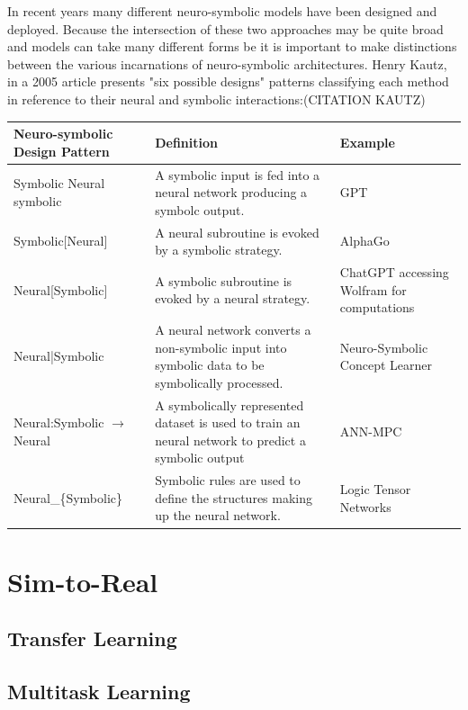 \documentclass[doublespace,draft,nopageskip]{VTthesis} %
\begin{document}
	In recent years many different neuro-symbolic models have been designed and deployed. Because the intersection of these two approaches may be quite broad and models can take many different forms be it is important to make distinctions between the various incarnations of neuro-symbolic architectures. Henry Kautz, in a 2005 article presents "six possible designs" patterns classifying each method in reference to their neural and symbolic interactions:(CITATION KAUTZ)
	\begin{scriptsize}
		\begin{center}
			\begin{tabular}{ | m{5cm} | m{5cm}| m{5cm} | }
				\hline
				\textbf{Neuro-symbolic Design Pattern} & \textbf{Definition} & \textbf{Example}\\
				\hline
				Symbolic Neural symbolic & A symbolic input is fed into a neural network producing a symbolc output. & GPT \\
				\hline
				Symbolic[Neural] & A neural subroutine is evoked by a symbolic strategy. & AlphaGo \\
				\hline
				Neural[Symbolic] & A symbolic subroutine is evoked by a neural strategy. & ChatGPT accessing Wolfram for computations\\
				\hline
				Neural|Symbolic & A neural network converts a non-symbolic input into symbolic data to be symbolically processed. & Neuro-Symbolic Concept Learner \\
				\hline
				Neural:Symbolic $\rightarrow$ Neural & A symbolically represented dataset is used to train an neural network to predict a symbolic output & ANN-MPC \\
				\hline
				Neural\_\{Symbolic\} & Symbolic rules are used to define the structures making up the neural network. & Logic Tensor Networks \\
				\hline
			\end{tabular}
		\end{center}
	\end{scriptsize}

    \section{Sim-to-Real} \label{se:sim_to_real}
        \subsection{Transfer Learning} \label{ss: transfer_learning}
        \subsection{Multitask Learning} \label{ss:multitask_learning}
\end{document}
